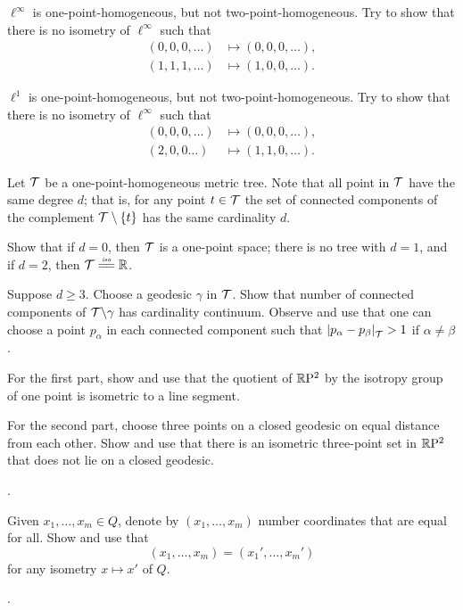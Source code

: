 $\ell^\infty$ is one-point-homogeneous, but not two-point-homogeneous.
Try to show that there is no isometry of $\ell^\infty$ such that
\begin{align*}
(0,0,0,\dots)&\mapsto (0,0,0,\dots),
\\
(1,1,1,\dots)&\mapsto (1,0,0,\dots).
\end{align*}

$\ell^1$ is one-point-homogeneous, but not two-point-homogeneous.
Try to show that there is no isometry of $\ell^\infty$ such that
\begin{align*}
(0,0,0,\dots)&\mapsto (0,0,0,\dots),
\\
(2,0,0\dots)&\mapsto (1,1,0,\dots).
\end{align*}

Let $\mathcal{T}$ be a one-point-homogeneous metric tree.
Note that all point in $\mathcal{T}$ have the same degree $d$;
that is, for any point $t\in \mathcal{T}$ the set of connected components of the complement $\mathcal{T}\setminus\{t\}$ has the same cardinality $d$.

Show that if $d=0$, then $\mathcal{T}$ is a one-point space;
there is no tree with $d=1$,
and if $d=2$, then $\spc{T}\iso\RR$.

Suppose $d\ge 3$.
Choose a geodesic $\gamma$ in $\mathcal{T}$.
Show that number of connected components of $\mathcal{T}\backslash\gamma$ has cardinality continuum.
Observe and use that one can choose a point $p_\alpha$ in each connected component such that $\dist{p_\alpha}{p_\beta}{\spc{T}}>1$ if $\alpha\ne\beta$.
 
For the first part, show and use that the quotient of $\mathbb{R}\mathrm{P}^2$ by the isotropy group of one point is isometric to a line segment.

For the second part, choose three points on a closed geodesic on equal distance from each other.
Show and use that there is an isometric three-point set in $\mathbb{R}\mathrm{P}^2$ that does not lie on a closed geodesic.

 \cite[V \S 2]{busemann-1942}.

Given $x_1,\dots,x_m\in Q$, denote by $(x_1,\dots,x_m)$ number coordinates that are equal for all.
Show and use that 
\[(x_1,\dots,x_m)=(x_1',\dots,x_m')\]
for any isometry $x\mapsto x'$ of $Q$.

 \cite[prop. 6 and 7]{berestovskii-nikonorov}.

